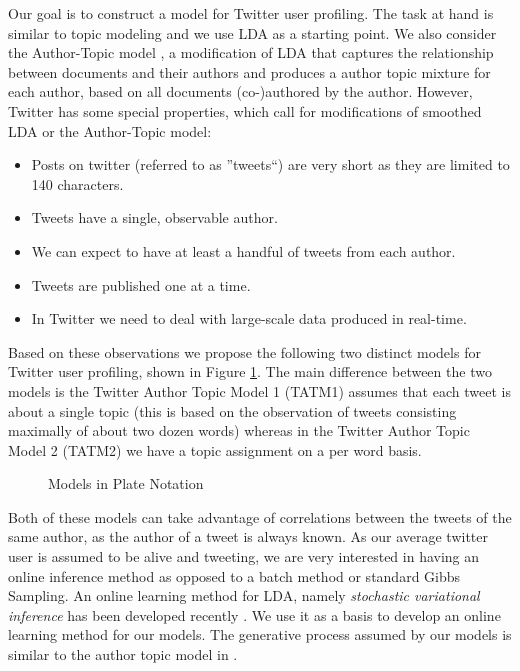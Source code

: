 \documentclass[12pt,abstracton,a4paper]{scrartcl}
\begin{document}
Our goal is to construct a model for Twitter user profiling. The task at hand is similar to topic modeling and we use LDA as a starting point. We also consider the Author-Topic model \cite{Rosen04}, a modification of LDA that captures the relationship between documents and their authors and produces a author topic mixture for each author, based on all documents (co-)authored by the author. However, Twitter has some special properties, which call for modifications of smoothed LDA or the Author-Topic model:
\begin{itemize}
	\item Posts on twitter (referred to as ''tweets``) are very short as they are limited to 140 characters.
	\item Tweets have a single, observable author.
	\item We can expect to have at least a handful of tweets from each author.
	\item Tweets are published one at a time.
	\item In Twitter we need to deal with large-scale data produced in real-time.
\end{itemize}
%
Based on these observations we propose the following two distinct models for Twitter user profiling, shown in Figure \ref{fig:plates}. The main difference between the two models is the Twitter Author Topic Model 1 (TATM1) assumes that each tweet is about a single topic (this is based on the observation of tweets consisting maximally of about two dozen words) whereas in the Twitter Author Topic Model 2 (TATM2) we have a topic assignment on a per word basis. 
%
\begin{figure}
	\caption{Models in Plate Notation}
	\label{fig:plates}
\end{figure}
%
Both of these models can take advantage of correlations between the tweets of the same author, as the author of a tweet is always known. As our average twitter user is assumed to be alive and tweeting, we are very interested in having an online inference method as opposed to a batch method or standard Gibbs Sampling. An online learning method for LDA, namely \textit{stochastic variational inference} has been developed recently \cite{Hoffman10,Hoffman12}. We use it as a basis to develop an online learning method for our models. The generative process assumed by our models is similar to the author topic model in \cite{Rosen04}. 
\end{document}
